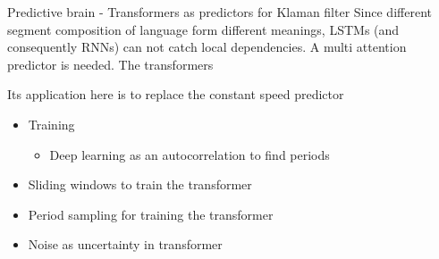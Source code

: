 \begin{frame}{Predictive brain - Transformers as predictors for Klaman filter}
    Since different segment composition of language form different meanings, LSTMs (and consequently RNNs) can not catch local dependencies. A multi attention predictor is needed. The transformers \cite{vaswani-2017-attention-is-all-you-need}
    
    Its application here is to replace the constant speed predictor
    
    
    \begin{itemize}
        \item Training
        \begin{itemize}
            \item Deep learning as an autocorrelation to find periods
        \end{itemize}
        \item Sliding windows to train the transformer
        \item Period sampling for training the transformer
        \item Noise as uncertainty in transformer
    
    \end{itemize}
\end{frame}